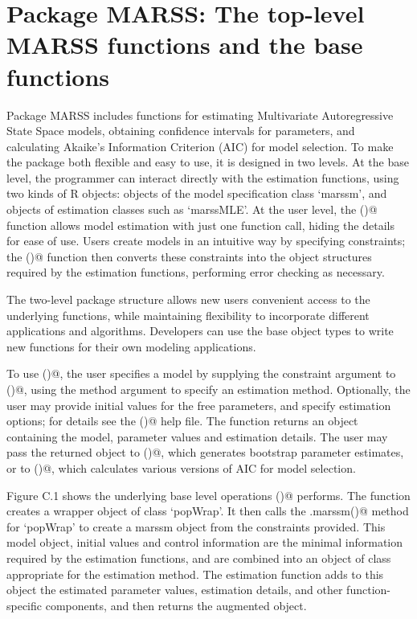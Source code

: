\chapter{Package MARSS:  The top-level MARSS functions and the base functions}

Package MARSS includes functions for estimating Multivariate Autoregressive State Space models, obtaining confidence intervals for parameters, and calculating Akaike's Information Criterion (AIC) for model selection.  To make the package both flexible and easy to use, it is designed in two levels.  At the base level, the programmer can interact directly with the estimation functions, using two kinds of R objects:  objects of the model specification class `marssm', and objects of estimation classes such as `marssMLE'.  At the user level, the \verb@MARSS()@ function allows model estimation with just one function call, hiding the details for ease of use.  Users create models in an intuitive way by specifying constraints; the \verb@MARSS()@ function then converts these constraints into the object structures required by the estimation functions, performing error checking as necessary.

The two-level package structure allows new users convenient access to the underlying functions, while maintaining flexibility to incorporate different applications and algorithms.  Developers can use the base object types to write new functions for their own modeling applications. 

To use \verb@MARSS()@, the user specifies a model by supplying the constraint argument to  \verb@MARSS()@, using the method argument to specify an estimation method.  Optionally, the user may provide initial values for the free parameters, and specify estimation options; for details see the  \verb@MARSS()@ help file.  The function returns an object containing the model, parameter values and estimation details.  The user may pass the returned object to  \verb@MARSSboot()@, which generates bootstrap parameter estimates, or to  \verb@MARSSaic()@, which calculates various versions of AIC for model selection.

Figure C.1 shows the underlying base level operations \verb@MARSS()@ performs.  The function creates a wrapper object of class `popWrap'.  It then calls the \verb@as.marssm()@ method for `popWrap' to create a marssm object from the constraints provided.  This model object, initial values and control information are the minimal information required by the estimation functions, and are combined into an object of class appropriate for the estimation method.  The estimation function adds to this object the estimated parameter values, estimation details, and other function-specific components, and then returns the augmented object.


